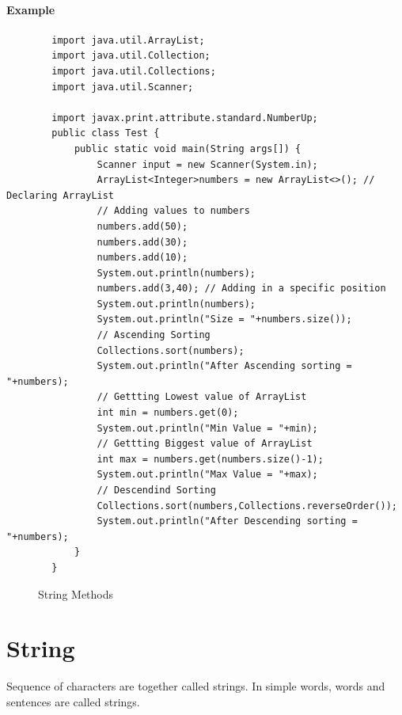 \documentclass[openany]{book}  %
\begin{document}
\subsubsection{Example}
\begin{center}
    \begin{verbatim}
        import java.util.ArrayList;
        import java.util.Collection;
        import java.util.Collections;
        import java.util.Scanner;

        import javax.print.attribute.standard.NumberUp;
        public class Test {
            public static void main(String args[]) {
                Scanner input = new Scanner(System.in);
                ArrayList<Integer>numbers = new ArrayList<>(); // Declaring ArrayList
                // Adding values to numbers
                numbers.add(50);
                numbers.add(30);
                numbers.add(10);
                System.out.println(numbers); 
                numbers.add(3,40); // Adding in a specific position
                System.out.println(numbers); 
                System.out.println("Size = "+numbers.size());
                // Ascending Sorting
                Collections.sort(numbers);
                System.out.println("After Ascending sorting = "+numbers);
                // Gettting Lowest value of ArrayList
                int min = numbers.get(0);
                System.out.println("Min Value = "+min);
                // Gettting Biggest value of ArrayList
                int max = numbers.get(numbers.size()-1);
                System.out.println("Max Value = "+max);
                // Descendind Sorting
                Collections.sort(numbers,Collections.reverseOrder());
                System.out.println("After Descending sorting = "+numbers);
            }
        }
    \end{verbatim}
\end{center}
% 
% 
\begin{figure}[htbp]
    \begin{center}
        \caption{String Methods\cite{Ref3}}
    \end{center}
\end{figure}
% 
% 
\chapter{String}
Sequence of characters are together called strings. In simple words,
words and sentences are called strings.
% 
% 
\end{document}
